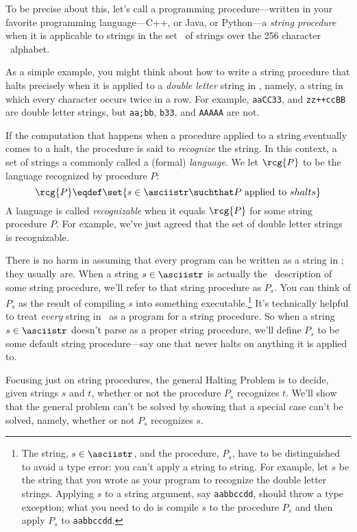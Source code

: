 To be precise about this, let's call a programming procedure---written
in your favorite programming language---C++, or Java, or Python---a
\emph{string procedure} when it is applicable to strings in the set
\asciistr\ of strings over the 256 character \asciibet\ alphabet.

As a simple example, you might think about how to write a string
procedure that halts precisely when it is applied to a \emph{double
  letter} string in \asciistr, namely, a string in which every
character occurs twice in a row.  For example, \texttt{aaCC33}, and
\texttt{zz++ccBB} are double letter strings, but \texttt{aa;bb},
\texttt{b33}, and \texttt{AAAAA} are not.

If the computation that happens when a procedure applied to a string
eventually comes to a halt, the procedure is said to \emph{recognize}
the string.  In this context, a set of strings a commonly called a
(formal) \emph{language}.  We let $\rcg{P}$ to be the language
recognized by procedure $P$:
\[
\rcg{P} \eqdef \set{s \in \asciistr \suchthat P \text{ applied to } s
  halts}
\]
A language is called \emph{recognizable} when it equals $\rcg{P}$ for
some string procedure $P$.  For example, we've just agreed that the
set of double letter strings is recognizable.

There is no harm in assuming that every program can be written as a
string in \asciistr; they usually are.  When a string $s \in
\asciistr$ is actually the \asciibet\ description of some string
procedure, we'll refer to that string procedure as $P_s$.  You can
think of $P_s$ as the result of compiling $s$ into something
executable.\footnote{The string, $s \in \asciistr$, and the procedure,
  $P_s$, have to be distinguished to avoid a type error: you can't
  apply a string to string.  For example, let $s$ be the string that
  you wrote as your program to recognize the double letter strings.
  Applying $s$ to a string argument, say \texttt{aabbccdd}, should
  throw a type exception; what you need to do is compile $s$ to the
  procedure $P_s$ and then apply $P_s$ to \texttt{aabbccdd}.} It's
technically helpful to treat \emph{every} string in \asciistr\ as a
program for a string procedure.  So when a string $s \in \asciistr$
doesn't parse as a proper string procedure, we'll define $P_s$ to be
some default string procedure---say one that never halts on anything
it is applied to.

Focusing just on string procedures, the general Halting Problem is to
decide, given strings $s$ and $t$, whether or not the procedure $P_s$
recognizes $t$.  We'll show that the general problem can't be solved
by showing that a special case can't be solved, namely, whether or not
$P_s$ recognizes $s$.

